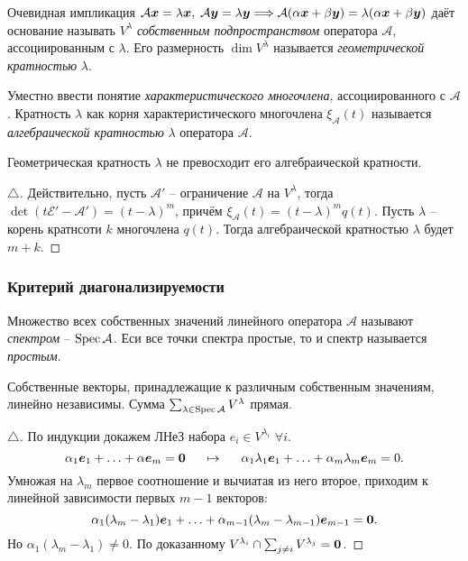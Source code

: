 Очевидная импликация
$
     \mathcal A \mbox{\boldmath $x$} = \lambda \mbox{\boldmath $x$}, \; \mathcal A \mbox{\boldmath $y$} = \lambda \mbox{\boldmath $y$} \Longrightarrow \mathcal A(\alpha \mbox{\boldmath $x$} + \beta \mbox{\boldmath $y$}) = \lambda(\alpha \mbox{\boldmath $x$} + \beta \mbox{\boldmath $y$})
 $ 
 даёт основание называть $V^{\lambda} $ \textit{собственным подпространством} оператора $\mathcal A $, ассоциированным с $\lambda $. Его размерность $\dim V^{\lambda} $ называется \textit{геометрической кратностью} $\lambda $.

Уместно ввести понятие \textit{характеристического многочлена}, ассоциированного с 
$\mathcal A $.  Кратность $\lambda $ как корня характеристического многочлена $\xi_{\mathcal A} (t)$ называется \textit{алгебраической кратностью} $\lambda $ оператора $\mathcal A $.

\begin{to_thr} 
     Геометрическая кратность $\lambda $ не превосходит его алгебраической кратности.
\end{to_thr}
 
\begin{proof}[$\triangle$]
Действительно, пусть $\mathcal A' $ -- ограничение $\mathcal A $ на $V^{\lambda} $, тогда $\det (t \mathcal E' - \mathcal A') = (t - \lambda)^m $, причём $\xi_{\mathcal A} (t) = (t-\lambda)^m q(t)$. Пусть $\lambda $ -- корень кратнсоти $k $ многочлена $q(t) $. Тогда алгебраической кратностью $\lambda $ будет $m+k $.
\end{proof}


\subsubsection{Критерий диагонализируемости}

\begin{to_def} 
    Множество всех собственных значений линейного оператора $\mathcal A $ называют \textit{спектром} -- $\mathop{\mathrm{Spec}}\nolimits \mathcal A $. Еси все точки спектра простые, то и спектр называется \textit{простым}.
\end{to_def}

\begin{to_lem} 
    Собственные векторы, принадлежащие к различным собственным значениям, линейно независимы. Сумма $\sum_{\lambda \in \mathop{\mathrm{Spec}}\nolimits \mathcal A} V^{\lambda}$ прямая. 
\end{to_lem}

\begin{proof}[$\triangle$]
    По индукции докажем ЛНеЗ набора $e_i \in V^{\lambda_i}$ $\forall i $. 
$$
    \alpha_1 \mbox{\boldmath $e$}_1 + \ldots + \alpha \mbox{\boldmath $e$}_m = \mbox{\boldmath $0$} \hspace{0.5cm} \mapsto \hspace{0.5cm} \alpha_1 \lambda_1 \mbox{\boldmath $e$}_1 + \ldots + \alpha_m \lambda_m \mbox{\boldmath $e$}_m = 0.
$$
Умножая на $\lambda_m $ первое соотношение и вычиатая из него второе, приходим к линейной зависимости первых $m-1 $ векторов:
$$
    \alpha_1 (\lambda_m - \lambda_1) \mbox{\boldmath $e$}_1 + \ldots 
    + \alpha_{m-1} (\lambda_m - \lambda_{m-1}) \mbox{\boldmath $e$}_{m-1} = \mbox{\boldmath $0$}.
$$
Но $\alpha_1 (\lambda_m - \lambda_1) \neq 0$. По доказанному $V^{\lambda_i} \cap \sum_{j \neq i} V^{\lambda_j} = \mbox{\boldmath $0$} $.
\end{proof}

